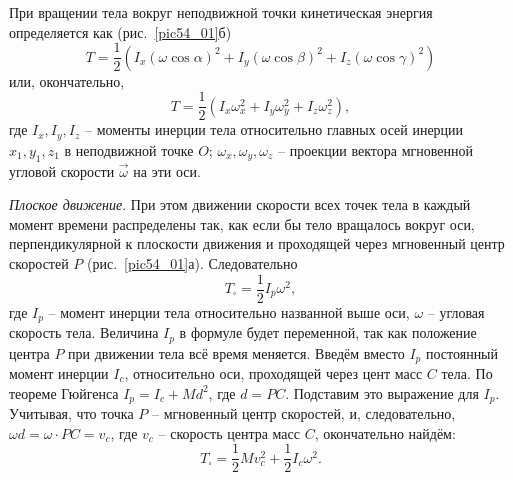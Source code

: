 При вращении тела вокруг неподвижной точки кинетическая энергия 
определяется как (рис.~\ref{pic54_01}б)
\[ 
	T = \frac{1}{2}\left( I_x(\omega\cos\alpha)^2 + 
	I_y(\omega\cos\beta)^2 + I_z(\omega\cos\gamma)^2 \right)
\]
или, окончательно, 
\[ 
	T = \frac{1}{2}\left( I_x\omega^2_x + I_y\omega^2_y + I_z\omega^2_z \right), 
\]
где \( I_x, I_y, I_z \) -- моменты инерции тела относительно главных 
осей инерции \( x_1, y_1, z_1 \) в неподвижной точке \( O \); 
\( \omega_x, \omega_y, \omega_z \) -- проекции вектора мгновенной 
угловой скорости \( \vec{\omega} \) на эти оси.

\emph{Плоское движение}. При этом движении скорости всех точек тела в 
каждый момент времени распределены так, как если бы тело вращалось 
вокруг оси, перпендикулярной к плоскости движения и проходящей через 
мгновенный центр скоростей \( P \) (рис.~\ref{pic54_01}а). Следовательно 
\[
	T_\square = \frac{1}{2}I_p \omega^2,
\]
где \( I_p \) -- момент инерции тела относительно названной выше оси, 
\( \omega \) -- угловая скорость тела. Величина \( I_p \) в формуле 
будет переменной, так как положение центра \( P \) при движении тела 
всё время меняется. Введём вместо \( I_p \) постоянный момент инерции 
\( I_c \), относительно оси, проходящей через цент масс \( C \) 
тела. По теореме Гюйгенса \( I_p = I_c + Md^2 \), где \( d = PC \). 
Подставим это выражение для \( I_p \). Учитывая, что точка \( P \) -- 
мгновенный центр скоростей, и, следовательно, 
\( \omega d = \omega\cdot PC = v_c \), где \( v_c \) -- скорость 
центра масс \( C \), окончательно найдём:
\[ 
	T_\square = \frac{1}{2}Mv^2_c + 
	\frac{1}{2}I_c \omega^2.
\]

\newpage
